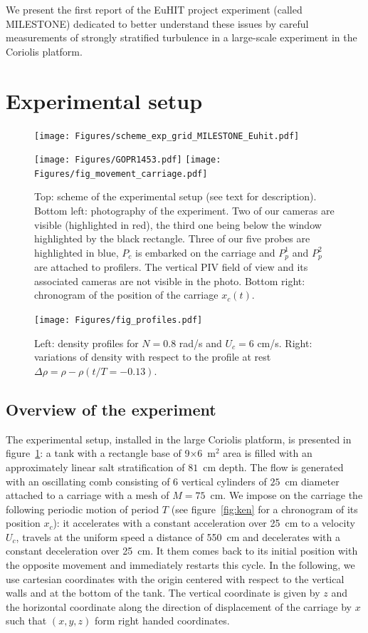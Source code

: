 \noindent We present the first report of the EuHIT project experiment (called
MILESTONE) dedicated to better understand these issues by careful measurements
of strongly stratified turbulence in a large-scale experiment in the Coriolis
platform.


\section{Experimental setup}

\begin{figure}[htb]
\centerline{
\texttt{[image: Figures/scheme\_exp\_grid\_MILESTONE\_Euhit.pdf]}}
\vspace{5mm}
\centerline{
\texttt{[image: Figures/GOPR1453.pdf]}
\texttt{[image: Figures/fig\_movement\_carriage.pdf]}}
\caption{Top: scheme of the experimental setup (see text for
description). Bottom left: photography of the experiment. Two of our cameras
are visible (highlighted in red), the third one being below the window
highlighted by the black rectangle. Three of our five probes are highlighted in
blue, $P_c$ is embarked on the carriage and $P_p^1$ and $P_p^2$ are attached to
profilers. The vertical PIV field of view and its associated cameras are not
visible in the photo. Bottom right: chronogram of the position of the carriage
$x_c(t)$.}
\label{fig:exp}
\end{figure}

\begin{figure}
\centerline{\texttt{[image: Figures/fig\_profiles.pdf]}}
\vspace{-2mm}
\caption{Left: density profiles for $N=0.8$ rad/s and $U_c = 6$ cm/s. Right:
variations of density with respect to the profile at rest
$\Delta\rho=\rho-\rho(t/T=-0.13)$.}
\label{fig_profiles}
\end{figure}

\subsection{Overview of the experiment}
\noindent The experimental setup, installed in the large Coriolis platform, is
presented in figure~\ref{fig:exp}: a tank with a rectangle base of
9$\times$6~m$^2$ area is filled with an approximately linear salt
stratification of $81$~cm depth. The flow is generated with an oscillating
comb consisting of 6 vertical cylinders of $25$~cm diameter attached to a
carriage with a mesh of $M=75$~cm. We impose on the carriage the following
periodic motion of period $T$ (see figure~\ref{fig:ken} for a chronogram of its
position $x_c$): it accelerates with a constant acceleration over 25~cm to a
velocity $U_c$, travels at the uniform speed a distance of 550~cm and
decelerates with a constant deceleration over 25~cm.  It them comes back to its
initial position with the opposite movement and immediately restarts this
cycle. In the following, we use cartesian coordinates with the origin
centered with respect to the vertical walls and at the bottom of the tank. The
vertical coordinate is given by $z$ and the horizontal coordinate along the
direction of displacement of the carriage by $x$ such that $(x,y,z)$ form right
handed coordinates.

